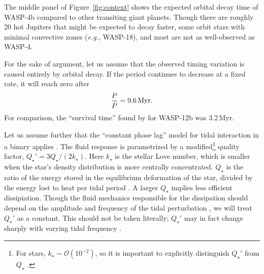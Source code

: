 \documentclass[12pt,twocolumn,tighten]{aastex62}
\begin{document}
The middle panel of Figure~\ref{fig:context} shows the expected
orbital decay time of WASP-4b compared to other transiting giant
planets.  Though there are roughly 20 hot Jupiters that might be
expected to decay faster, some orbit stars with minimal convective
zones ({\it e.g.}, WASP-18), and most are not as well-observed as
WASP-4.

For the sake of argument,
let us assume that the observed timing
variation is caused entirely by orbital decay.  If the period
continues to decrease at a fixed rate, it will reach zero after
\begin{equation}
  \frac{P}{ \dot{P} } = 9.6 \, {\rm Myr}.
\end{equation}
For comparison, the ``survival time'' found by \citet{patra_2017} for
WASP-12b was 3.2\,Myr.

Let us assume further that the ``constant phase lag'' model for tidal
interaction in a binary applies \citep{zahn_tidal_1977}.  The fluid
response is parametrized by a modified\footnote{For stars,
$k_\star \sim \mathcal{O}(10^{-2})$, so it is important to explicitly
distinguish $Q_\star'$ from $Q_\star$ \citep[{\it
e.g.},][]{schwarzschild_structure_1958}.} quality factor, $Q_\star' =
3 Q_\star / (2k_\star)$.  Here $k_\star$ is the stellar Love number,
which is smaller when the star's density distribution is more
centrally concentrated. $Q_\star$ is the ratio of the energy stored in
the equilibrium deformation of the star, divided by the energy
lost to heat per tidal period \citep[{\it e.g.},][]{goldreich_q_1966}.
A larger $Q_\star$ implies less efficient dissipiation.  Though the
fluid mechanics responsible for the dissipation should depend on the
amplitude and frequency of the tidal perturbation
\citep[][Section~3.3]{ogilvie_tidal_2014}, we will treat $Q_\star'$ as
a constant.  This should not be taken literally; $Q_\star'$ may in
fact change sharply with varying tidal frequency
\citep{penev_empirical_2018}.
\end{document}
